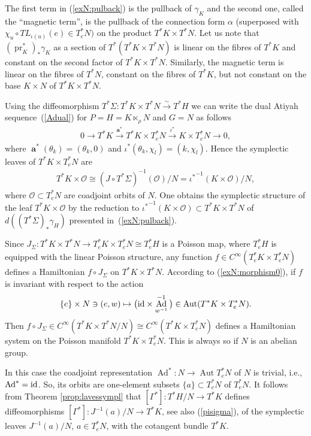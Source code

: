 \documentclass[pdftex]{sigma}
\renewcommand{\O}{\mathcal{O}}
\renewcommand{\to}{\rightarrow}
\DeclareMathOperator{\Ad}{Ad}
\DeclareMathOperator{\anch}{\mathbf{a}}
\newcommand{\id}{\text{\upshape id}}
\newcommand{\Aut}{\operatorname{Aut}}
\numberwithin{equation}{section}
\begin{document}
The f\/irst term in (\ref{exN:pulback}) is the pullback of $\gamma_K$ and the second one,
called the ``magnetic term'', is the pullback of the connection form $\alpha$ (superposed with $\chi_u\circ TL_{\iota(u)}(e)\in T^*_e N)$ on the product $T^*K\times T^*N$. Let us note that $(\operatorname{pr}^*_K)_*\gamma_K$ as a section of $T^*(T^*K\times T^*N)$ is linear on the f\/ibres of $T^*K$ and constant on the second factor of $T^*K\times T^*N$. Similarly, the magnetic term is linear on the f\/ibres of $T^*N$, constant on the f\/ibres of $T^*K$, but not constant on the base $K\times N$ of $T^*K\times T^*N$.

Using the dif\/feomorphism $T^*\Sigma\colon T^*K\times T^*N\stackrel{\sim}{\to} T^*H$ we can write the dual Atiyah sequence~(\ref{Adual}) for $P=H=K\ltimes_\rho N$ and $G=N$ as follows
\begin{gather*} 0\longrightarrow T^*K\stackrel{\anch^*}{\longrightarrow}T^*K\times T^*_eN \stackrel{\iota^*}{\longrightarrow} K\times T^*_eN\longrightarrow 0, \end{gather*}
where $\anch^*(\theta_k)=(\theta_k, 0)$ and $\iota^*(\theta_k, \chi_l)=(k,\chi_l)$. Hence the symplectic leaves of $T^*K\times T^*_eN$ are
\begin{gather*} T^*K\times \O\cong (J\circ T^*\Sigma)^{-1}(\O)/N={\iota^*}^{-1}(K\times\O)/N,\end{gather*}
where $\O\subset T^*_eN$ are coadjoint orbits of $N$. One obtains the symplectic structure
of the leaf $T^*K\times \O$ by the reduction to ${\iota^*}^{-1}(K\times\O)\subset T^*K\times T^*N$ of $d((T^*\Sigma)_*\gamma_H)$ presented in~(\ref{exN:pulback}).

Since $J_\Sigma\colon T^*K\times T^*N\to T^*_eK\times T^*_eN\cong T^*_eH$
is a Poisson map, where $T^*_eH$ is equipped with the linear Poisson structure, any function $f\in C^\infty(T^*_eK\times T^*_eN)$ def\/ines a Hamiltonian $f\circ J_\Sigma$ on $T^*K\times T^*N$. According to (\ref{exN:morphism0}), if $f$ is invariant with respect to the action
\begin{gather*} \{e\}\times N\ni(e,w)\mapsto\big(\id\times \Ad^{-1}_{w^{-1}}\big)\in \Aut(T^*K\times T^*_eN).\end{gather*}
Then $f\circ J_\Sigma\in C^\infty(T^*K\times T^*N/N)\cong C^\infty(T^*K\times T^*_eN)$ def\/ines a Hamiltonian system on the Poisson manifold $T^*K\times T^*_eN$. This is always so if $N$ is an abelian group.

In this case the coadjoint representation $\Ad^*\colon N\to \Aut T^*_eN$ of $N$ is trivial, i.e., $\Ad^*=\id$. So, its orbits are one-element subsets $\{a\}\subset T^*_eN$ of $T^*_eN$. It follows from Theorem \ref{prop:lavessympl} that $[\Gamma^*]\colon T^*H/N\to T^*K$ def\/ines dif\/feomorphisms $[\Gamma^*]\colon J^{-1}(a)/N\to T^*K$, see also (\ref{pisigma}), of the symplectic leaves $J^{-1}(a)/N$, $a\in T^*_eN$, with the cotangent bundle $T^*K$.
\end{document}
